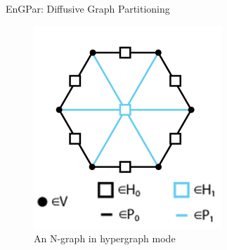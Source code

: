 \documentclass{beamer}
\begin{document}
\begin{textblock}{15.6}
\begin{textblock}{5.1}
\begin{block}{\centering EnGPar: Diffusive Graph Partitioning}
\begin{textblock}{2.5}
        \vspace{-1cm}
        \begin{figure}
          \centering
          \includegraphics[width = .7\textwidth]{../figures/HyperNgraph.png}
          \caption{An N-graph in hypergraph mode}
        \end{figure}


\end{textblock}
\end{block}
\end{textblock}
\end{textblock}
\end{document}
